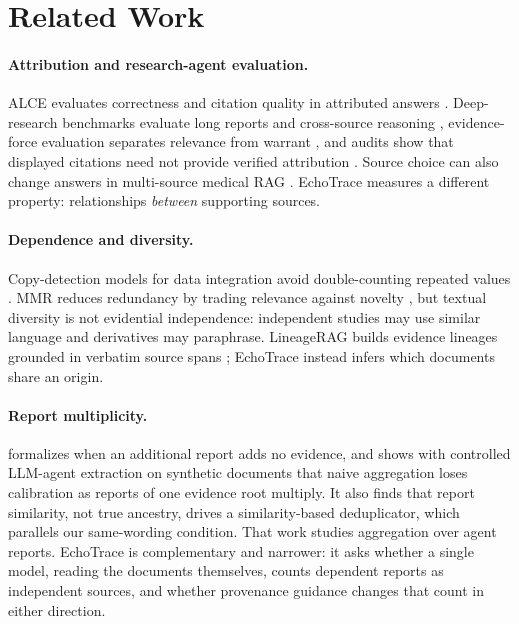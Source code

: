 \documentclass[11pt]{article}
\begin{document}
\section{Related Work}
\paragraph{Attribution and research-agent evaluation.}
ALCE evaluates correctness and citation quality in attributed answers \citep{gao2023alce}.
Deep-research benchmarks evaluate long reports and cross-source reasoning
\citep{du2025deepresearch,xie2026deepweb}, evidence-force evaluation separates relevance from
warrant \citep{qian2026force}, and audits show that displayed citations need not provide verified
attribution \citep{onweller2026cited}. Source choice can also change answers in multi-source medical
RAG \citep{li2026transplantqa}. EchoTrace measures a different property: relationships
\emph{between} supporting sources.

\paragraph{Dependence and diversity.}
Copy-detection models for data integration avoid double-counting repeated values
\citep{dong2009dependence}. MMR reduces redundancy by trading relevance against novelty
\citep{goldstein1998mmr}, but textual diversity is not evidential independence: independent studies
may use similar language and derivatives may paraphrase. LineageRAG builds evidence lineages grounded in
verbatim source spans \citep{zheng2026lineagerag}; EchoTrace instead infers which documents share
an origin.

\paragraph{Report multiplicity.}
\citet{bara2026sybil} formalizes when an additional report adds no evidence, and shows with
controlled LLM-agent extraction on synthetic documents that naive aggregation loses calibration as
reports of one evidence root multiply. It also finds that report similarity, not true ancestry,
drives a similarity-based deduplicator, which parallels our same-wording condition. That work
studies aggregation over agent reports. EchoTrace is complementary and narrower: it asks whether a
single model, reading the documents themselves, counts dependent reports as independent sources,
and whether provenance guidance changes that count in either direction.
\end{document}
